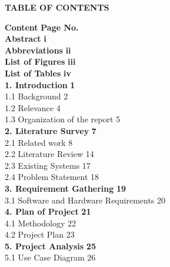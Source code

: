 \documentclass[12pt]{article}
\begin{document}
\begin{center}
    {\Large \bfseries TABLE OF CONTENTS}
\end{center}

\vspace{1em}

\noindent \textbf{Content} \hfill \textbf{Page No.} \\[6pt]
\textbf{Abstract} \hfill \textbf{i} \\[6pt]
\textbf{Abbreviations} \hfill \textbf{ii} \\[6pt]
\textbf{List of Figures} \hfill \textbf{iii} \\[6pt]
\textbf{List of Tables} \hfill \textbf{iv} \\[6pt]
\textbf{1. Introduction} \hfill \textbf{1} \\[6pt]
\hspace{1cm} 1.1 Background \hfill 2 \\[6pt]
\hspace{1cm} 1.2 Relevance \hfill 4 \\[6pt]
\hspace{1cm} 1.3 Organization of the report \hfill 5 \\[6pt]
\textbf{2. Literature Survey} \hfill \textbf{7} \\[6pt]
\hspace{1cm} 2.1 Related work \hfill 8 \\[6pt]
\hspace{1cm} 2.2 Literature Review \hfill 14 \\[6pt]
\hspace{1cm} 2.3 Existing Systems \hfill 17 \\[6pt]
\hspace{1cm} 2.4 Problem Statement \hfill 18 \\[6pt]
\textbf{3. Requirement Gathering} \hfill \textbf{19} \\[6pt]
\hspace{1cm} 3.1 Software and Hardware Requirements \hfill 20 \\[6pt]
\textbf{4. Plan of Project} \hfill \textbf{21} \\[6pt]
\hspace{1cm} 4.1 Methodology \hfill 22 \\[6pt]
\hspace{1cm} 4.2 Project Plan \hfill 23 \\[6pt]
\textbf{5. Project Analysis} \hfill \textbf{25} \\[6pt]
\hspace{1cm} 5.1 Use Case Diagram \hfill 26 \\ [6pt]
\end{document}
